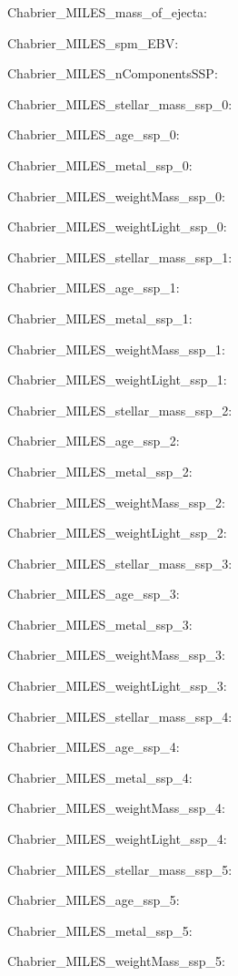 \item Chabrier\_MILES\_mass\_of\_ejecta: 
\item Chabrier\_MILES\_spm\_EBV: 
\item Chabrier\_MILES\_nComponentsSSP: 
\item Chabrier\_MILES\_stellar\_mass\_ssp\_0: 
\item Chabrier\_MILES\_age\_ssp\_0: 
\item Chabrier\_MILES\_metal\_ssp\_0: 
\item Chabrier\_MILES\_weightMass\_ssp\_0: 
\item Chabrier\_MILES\_weightLight\_ssp\_0: 
\item Chabrier\_MILES\_stellar\_mass\_ssp\_1: 
\item Chabrier\_MILES\_age\_ssp\_1: 
\item Chabrier\_MILES\_metal\_ssp\_1: 
\item Chabrier\_MILES\_weightMass\_ssp\_1: 
\item Chabrier\_MILES\_weightLight\_ssp\_1: 
\item Chabrier\_MILES\_stellar\_mass\_ssp\_2: 
\item Chabrier\_MILES\_age\_ssp\_2: 
\item Chabrier\_MILES\_metal\_ssp\_2: 
\item Chabrier\_MILES\_weightMass\_ssp\_2: 
\item Chabrier\_MILES\_weightLight\_ssp\_2: 
\item Chabrier\_MILES\_stellar\_mass\_ssp\_3: 
\item Chabrier\_MILES\_age\_ssp\_3: 
\item Chabrier\_MILES\_metal\_ssp\_3: 
\item Chabrier\_MILES\_weightMass\_ssp\_3: 
\item Chabrier\_MILES\_weightLight\_ssp\_3: 
\item Chabrier\_MILES\_stellar\_mass\_ssp\_4: 
\item Chabrier\_MILES\_age\_ssp\_4: 
\item Chabrier\_MILES\_metal\_ssp\_4: 
\item Chabrier\_MILES\_weightMass\_ssp\_4: 
\item Chabrier\_MILES\_weightLight\_ssp\_4: 
\item Chabrier\_MILES\_stellar\_mass\_ssp\_5: 
\item Chabrier\_MILES\_age\_ssp\_5: 
\item Chabrier\_MILES\_metal\_ssp\_5: 
\item Chabrier\_MILES\_weightMass\_ssp\_5: 
